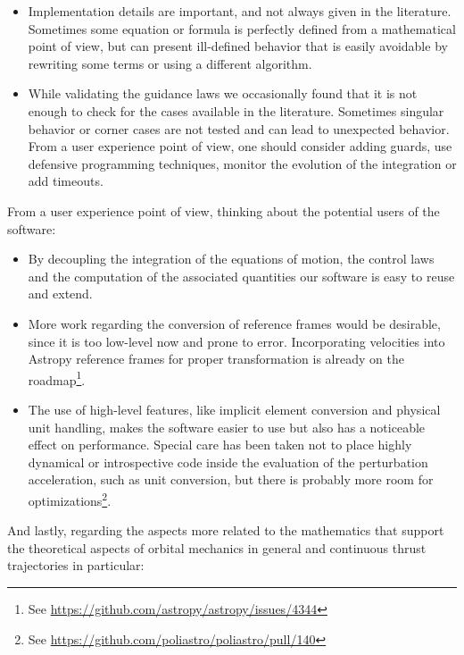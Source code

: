 \begin{itemize}
\item Implementation details are important, and not always given in the literature. Sometimes some equation or formula is perfectly defined from a mathematical point of view, but can present ill-defined behavior that is easily avoidable by rewriting some terms or using a different algorithm.
%
\item While validating the guidance laws we occasionally found that it is not enough to check for the cases available in the literature. Sometimes singular behavior or corner cases are not tested and can lead to unexpected behavior. From a user experience point of view, one should consider adding guards, use defensive programming techniques, monitor the evolution of the integration or add timeouts.
\end{itemize}

From a user experience point of view, thinking about the potential users of the software:

\begin{itemize}
\item By decoupling the integration of the equations of motion, the control laws and the computation of the associated quantities our software is easy to reuse and extend.
\item More work regarding the conversion of reference frames would be desirable, since it is too low-level now and prone to error. Incorporating velocities into Astropy reference frames for proper transformation is already on the roadmap\footnote{See \url{https://github.com/astropy/astropy/issues/4344}}.
\item The use of high-level features, like implicit element conversion and physical unit handling, makes the software easier to use but also has a noticeable effect on performance. Special care has been taken not to place highly dynamical or introspective code inside the evaluation of the perturbation acceleration, such as unit conversion, but there is probably more room for optimizations\footnote{See \url{https://github.com/poliastro/poliastro/pull/140}}.
\end{itemize}

And lastly, regarding the aspects more related to the mathematics that support the theoretical aspects of orbital mechanics in general and continuous thrust trajectories in particular:

